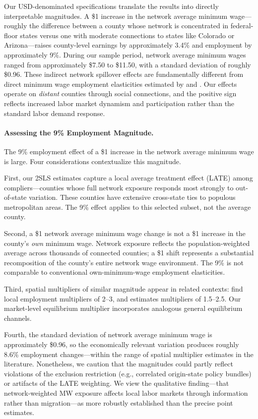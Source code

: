 \documentclass[12pt]{article}
\begin{document}
Our USD-denominated specifications translate the results into directly interpretable magnitudes. A \$1 increase in the network average minimum wage---roughly the difference between a county whose network is concentrated in federal-floor states versus one with moderate connections to states like Colorado or Arizona---raises county-level earnings by approximately 3.4\% and employment by approximately 9\%. During our sample period, network average minimum wages ranged from approximately \$7.50 to \$11.50, with a standard deviation of roughly \$0.96. These indirect network spillover effects are fundamentally different from direct minimum wage employment elasticities estimated by \citet{cengiz2019effect} and \citet{jardim2024}. Our effects operate on \textit{distant} counties through social connections, and the positive sign reflects increased labor market dynamism and participation rather than the standard labor demand response.

\paragraph{Assessing the 9\% Employment Magnitude.} The 9\% employment effect of a \$1 increase in the network average minimum wage is large. Four considerations contextualize this magnitude.

First, our 2SLS estimates capture a local average treatment effect (LATE) among compliers---counties whose full network exposure responds most strongly to out-of-state variation. These counties have extensive cross-state ties to populous metropolitan areas. The 9\% effect applies to this selected subset, not the average county.

Second, a \$1 network average minimum wage change is not a \$1 increase in the county's \textit{own} minimum wage. Network exposure reflects the population-weighted average across thousands of connected counties; a \$1 shift represents a substantial recomposition of the county's entire network wage environment. The 9\% is not comparable to conventional own-minimum-wage employment elasticities.

Third, spatial multipliers of similar magnitude appear in related contexts: \citet{klinemoretti2014} find local employment multipliers of 2--3, and \citet{moretti2011local} estimates multipliers of 1.5--2.5. Our market-level equilibrium multiplier incorporates analogous general equilibrium channels.

Fourth, the standard deviation of network average minimum wage is approximately \$0.96, so the economically relevant variation produces roughly 8.6\% employment changes---within the range of spatial multiplier estimates in the literature. Nonetheless, we caution that the magnitudes could partly reflect violations of the exclusion restriction (e.g., correlated origin-state policy bundles) or artifacts of the LATE weighting. We view the qualitative finding---that network-weighted MW exposure affects local labor markets through information rather than migration---as more robustly established than the precise point estimates.
\end{document}
